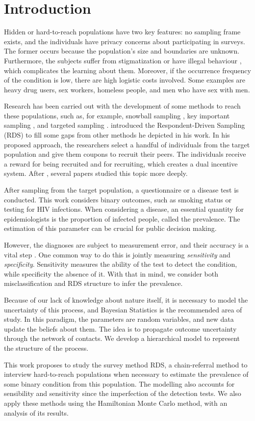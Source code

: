 \chapter{Introduction}

Hidden or hard-to-reach populations have two key features: no sampling frame
exists, and the individuals have privacy concerns about participating in
surveys. The former occurs because the population's size and boundaries are
unknown. Furthermore, the subjects suffer from stigmatization or have illegal
behaviour \cite{heckathorn1997}, which complicates the learning about them. Moreover, if the
occurrence frequency of the condition is low, there are high logistic costs
involved. Some examples are heavy drug users, sex workers, homeless people,
and men who have sex with men.

Research has been carried out with the development of some methods to reach these populations, such as, for example, snowball sampling \cite{goodman1961}, key
important sampling \cite{deaux-callaghan1985}, 
and targeted sampling \cite{watters-biernacki1989}. \textcite{heckathorn1997} introduced the Respondent-Driven Sampling (RDS) to fill some gaps from other methods he depicted in his work. In his proposed approach, the researchers select a handful of individuals from the target population and give them coupons to recruit their peers. The individuals receive a reward for being recruited and for recruiting, which creates a dual incentive system. After \textcite{heckathorn1997}, several papers studied this topic more deeply. 

After sampling from the target population, a questionnaire or a disease test is conducted. This work considers binary outcomes, such as smoking status or testing for HIV infections. When considering a disease, an essential quantity for epidemiologists is the proportion of infected people, called the prevalence. The estimation of this parameter can be crucial for public decision making. 

However, the diagnoses are subject to measurement error, and their accuracy is
a vital step \cite{reitsma2005bivariate}. One common way to do this is jointly measuring {\em
sensitivity} and {\em specificity}. Sensitivity measures the ability of the
test to detect the condition, while specificity the absence of it. With that
in mind, we consider both misclassification and RDS structure to infer the
prevalence. 

Because of our lack of knowledge about nature itself, it is necessary to model the uncertainty of this process, and Bayesian Statistics is the recommended area of study. In this paradigm, the parameters are random variables, and new data update the beliefs about them. The idea is to propagate outcome uncertainty through the network of contacts. We develop a hierarchical model to represent the structure of the process. 

This work proposes to study the survey method RDS, a chain-referral method to interview hard-to-reach populations when necessary to estimate the prevalence of some binary condition from this population. The modelling also accounts for sensibility and sensitivity since the imperfection of the detection tests. We also apply these methods using the Hamiltonian Monte Carlo method, with an analysis of its results.